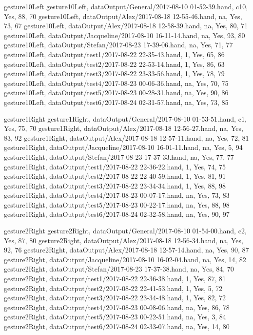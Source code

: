 gesture10Left
gesture10Left, dataOutput/General/2017-08-10 01-52-39.hand, c10, Yes, 88, 70
gesture10Left, dataOutput/Alex/2017-08-18 12-55-46.hand, na, Yes, 73, 67
gesture10Left, dataOutput/Alex/2017-08-18 12-58-39.hand, na, Yes, 80, 71
gesture10Left, dataOutput/Jacqueline/2017-08-10 16-11-14.hand, na, Yes, 93, 80
gesture10Left, dataOutput/Stefan/2017-08-23 17-39-06.hand, na, Yes, 71, 77
gesture10Left, dataOutput/test1/2017-08-22 22-35-43.hand, 1, Yes, 65, 86
gesture10Left, dataOutput/test2/2017-08-22 22-53-14.hand, 1, Yes, 86, 63
gesture10Left, dataOutput/test3/2017-08-22 23-33-56.hand, 1, Yes, 78, 79
gesture10Left, dataOutput/test4/2017-08-23 00-06-36.hand, na, Yes, 70, 75
gesture10Left, dataOutput/test5/2017-08-23 00-28-31.hand, na, Yes, 90, 86
gesture10Left, dataOutput/test6/2017-08-24 02-31-57.hand, na, Yes, 73, 85

gesture1Right
gesture1Right, dataOutput/General/2017-08-10 01-53-51.hand, c1, Yes, 75, 70
gesture1Right, dataOutput/Alex/2017-08-18 12-56-27.hand, na, Yes, 83, 92
gesture1Right, dataOutput/Alex/2017-08-18 12-57-11.hand, na, Yes, 72, 81
gesture1Right, dataOutput/Jacqueline/2017-08-10 16-01-11.hand, na, Yes, 5, 94
gesture1Right, dataOutput/Stefan/2017-08-23 17-37-33.hand, na, Yes, 77, 77
gesture1Right, dataOutput/test1/2017-08-22 22-36-22.hand, 1, Yes, 74, 75
gesture1Right, dataOutput/test2/2017-08-22 22-40-59.hand, 1, Yes, 81, 91
gesture1Right, dataOutput/test3/2017-08-22 23-34-34.hand, 1, Yes, 88, 98
gesture1Right, dataOutput/test4/2017-08-23 00-07-17.hand, na, Yes, 73, 83
gesture1Right, dataOutput/test5/2017-08-23 00-22-17.hand, na, Yes, 88, 98
gesture1Right, dataOutput/test6/2017-08-24 02-32-58.hand, na, Yes, 90, 97

gesture2Right
gesture2Right, dataOutput/General/2017-08-10 01-54-00.hand, c2, Yes, 87, 80
gesture2Right, dataOutput/Alex/2017-08-18 12-56-34.hand, na, Yes, 92, 76
gesture2Right, dataOutput/Alex/2017-08-18 12-57-14.hand, na, Yes, 90, 87
gesture2Right, dataOutput/Jacqueline/2017-08-10 16-02-04.hand, na, Yes, 14, 82
gesture2Right, dataOutput/Stefan/2017-08-23 17-37-38.hand, na, Yes, 84, 70
gesture2Right, dataOutput/test1/2017-08-22 22-36-38.hand, 1, Yes, 87, 81
gesture2Right, dataOutput/test2/2017-08-22 22-41-53.hand, 1, Yes, 5, 72
gesture2Right, dataOutput/test3/2017-08-22 23-34-48.hand, 1, Yes, 82, 72
gesture2Right, dataOutput/test4/2017-08-23 00-08-06.hand, na, Yes, 86, 78
gesture2Right, dataOutput/test5/2017-08-23 00-22-51.hand, na, Yes, 3, 84
gesture2Right, dataOutput/test6/2017-08-24 02-33-07.hand, na, Yes, 14, 80


